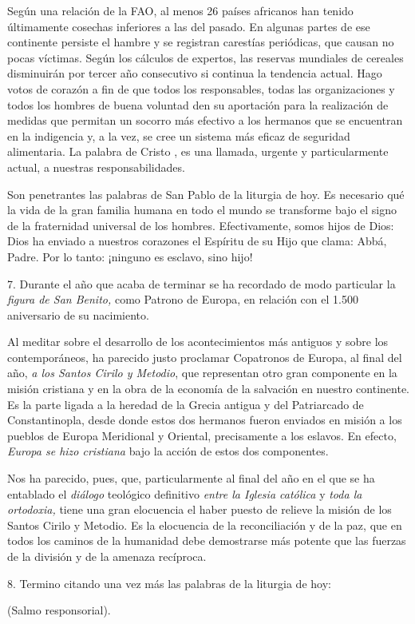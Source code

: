 \begin{body}
	Según una relación de la FAO, al menos 26 países africanos han tenido últimamente cosechas inferiores a las del pasado. En algunas partes de ese continente persiste el hambre y se registran carestías periódicas, que causan no pocas víctimas. Según los cálculos de expertos, las reservas mundiales de cereales disminuirán por tercer año consecutivo si continua la tendencia actual. Hago votos de corazón a fin de que todos los responsables, todas las organizaciones y todos los hombres de buena voluntad den su aportación para la realización de medidas que permitan un socorro más efectivo a los hermanos que se encuentran en la indigencia y, a la vez, se cree un sistema más eficaz de seguridad alimentaria. La palabra de Cristo , es una llamada, urgente y particularmente actual, a nuestras responsabilidades.
	
	Son penetrantes las palabras de San Pablo de la liturgia de hoy. Es necesario qué la vida de la gran familia humana en todo el mundo se transforme bajo el signo de la fraternidad universal de los hombres. Efectivamente, somos hijos de Dios: Dios ha enviado a nuestros corazones el Espíritu de su Hijo que clama: Abbá, Padre. Por lo tanto: ¡ninguno es esclavo, sino hijo!
	
	7. Durante el año que acaba de terminar se ha recordado de modo particular la \emph{figura de San Benito,} como Patrono de Europa, en relación con el 1.500 aniversario de su nacimiento.
	
	Al meditar sobre el desarrollo de los acontecimientos más antiguos y sobre los contemporáneos, ha parecido justo proclamar Copatronos de Europa, al final del año, \emph{a los Santos Cirilo y Metodio}, que representan otro gran componente en la misión cristiana y en la obra de la economía de la salvación en nuestro continente. Es la parte ligada a la heredad de la Grecia antigua y del Patriarcado de Constantinopla, desde donde estos dos hermanos fueron enviados en misión a los pueblos de Europa Meridional y Oriental, precisamente a los eslavos. En efecto, \emph{Europa se hizo cristiana} bajo la acción de estos dos componentes.
	
	Nos ha parecido, pues, que, particularmente al final del año en el que se ha entablado el \emph{diálogo} teológico definitivo \emph{entre la Iglesia católica} y \emph{toda la ortodoxia,} tiene una gran elocuencia el haber puesto de relieve la misión de los Santos Cirilo y Metodio. Es la elocuencia de la reconciliación y de la paz, que en todos los caminos de la humanidad debe demostrarse más potente que las fuerzas de la división y de la amenaza recíproca.
	
	8. Termino citando una vez más las palabras de la liturgia de hoy:
	
	 (Salmo responsorial).
\end{body}

